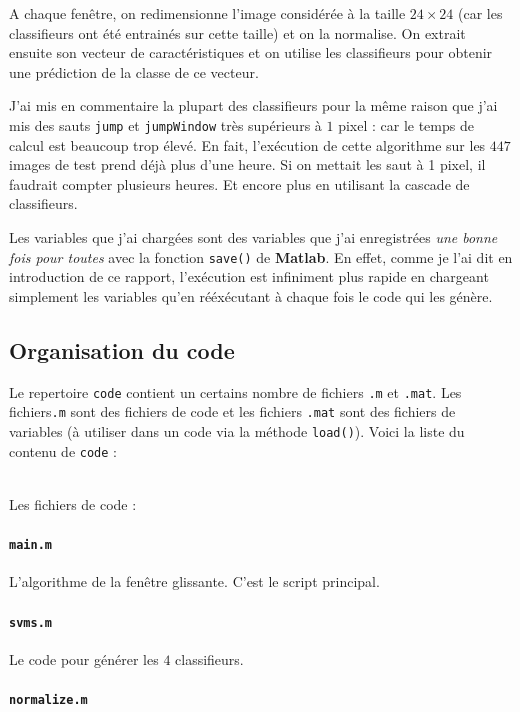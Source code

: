 \documentclass[11pt]{report}
\begin{document}
A chaque fenêtre, on redimensionne l'image considérée à la taille $24 \times 24$ (car les classifieurs ont été entrainés sur cette taille) et on la normalise. On extrait ensuite son vecteur de caractéristiques et on utilise les classifieurs pour obtenir une prédiction de la classe de ce vecteur. 

J'ai mis en commentaire la plupart des classifieurs pour la même raison que j'ai mis des sauts \verb|jump| et \verb|jumpWindow| très supérieurs à $1$ pixel : car le temps de calcul est beaucoup trop élevé. En fait, l'exécution de cette algorithme sur les $447$ images de test prend déjà plus d'une heure. Si on mettait les saut à 1 pixel, il faudrait compter plusieurs heures. Et encore plus en utilisant la cascade de classifieurs. 

Les variables que j'ai chargées sont des variables que j'ai enregistrées \textit{une bonne fois pour toutes} avec la fonction \verb|save()| de \textbf{Matlab}. En effet, comme je l'ai dit en introduction de ce rapport, l'exécution est infiniment plus rapide en chargeant simplement les variables qu'en rééxécutant à chaque fois le code qui les génère.

\newpage
\subsection*{Organisation du code}

Le repertoire \verb|code| contient un certains nombre de fichiers \verb|.m| et \verb|.mat|. Les fichiers\verb|.m| sont des fichiers de code et les fichiers \verb|.mat| sont des fichiers de variables (à utiliser dans un code via la méthode \verb|load()|). Voici la liste du contenu de \verb|code| :

~\\
Les fichiers de code :

\paragraph*{\protect\Verb+main.m+}

L'algorithme de la fenêtre glissante. C'est le script principal.

\paragraph*{\protect\Verb+svms.m+}

Le code pour générer les $4$ classifieurs.

\paragraph*{\protect\Verb+normalize.m+}
\end{document}
